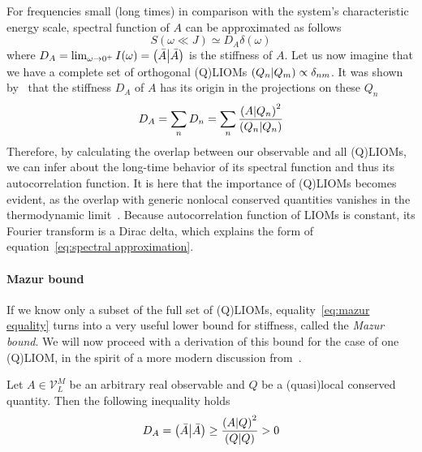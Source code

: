 For frequencies small (long times) in comparison with the system's characteristic energy
scale, spectral function of \(A \) can be approximated as follows
\begin{equation}
  S(\omega \ll  J) \simeq  D_{A} \delta(\omega)
  \label{eq:spectral approximation}
\end{equation}
where \(D_A = \lim_{\omega\to 0^+} I(\omega) = \left(\bar{A} \middle| \bar{A}\right)\) is the stiffness of \(A\).
Let us now imagine that we have a complete set of orthogonal (Q)LIOMs 
\(\left(Q_{n} \middle| Q_{m}\right) \propto \delta_{nm}\). It was shown 
by~\textcite{Mazur1969,Suzuki1971} that the stiffness \(D_{A}\) of \(A\) has its origin
in the projections on these \(Q_{n}\)
\begin{equation}
  D_A = \sum_{n} D_{n} = \sum_{n} \frac{\left(A \middle| Q_{n}\right)^2}
  {\left(Q_{n} \middle| Q_{n}\right)}
  \label{eq:mazur equality}
\end{equation}
Therefore, by calculating the overlap between our observable and all (Q)LIOMs, we can infer about the long-time
behavior of its spectral function and thus its autocorrelation function. It is here that the
importance of (Q)LIOMs becomes evident, as the overlap with generic nonlocal conserved quantities
vanishes in the thermodynamic limit~\autocite{Zotos1997}.
Because autocorrelation function of
LIOMs is constant, its Fourier transform is a Dirac delta, which explains the form of 
equation~\eqref{eq:spectral approximation}. 

\paragraph{Mazur bound} If we know only a subset of the full set of (Q)LIOMs, 
equality~\eqref{eq:mazur equality} turns into 
a very useful lower bound for stiffness, called the \textit{Mazur bound}. We will now proceed with a derivation
of this bound for the case of one (Q)LIOM, in the spirit of a more modern discussion from~\textcite{Ilievski2016a}.
\begin{proposition}
  Let \(A\in \mathcal{V}_L^M\) be an arbitrary real observable and \(Q\) be a (quasi)local conserved quantity. Then the following inequality
  holds
  \begin{equation*}
    D_{A} = \left(\bar{A} \middle| \bar{A}\right) \geq \frac{\left(A \middle| Q\right)^2}{\left(Q \middle| Q\right)} > 0
  \end{equation*}
  \label{prop:single mazur}
\end{proposition}

